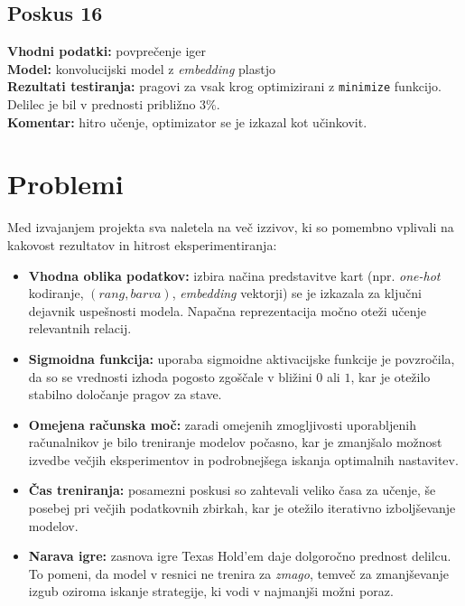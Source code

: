 \documentclass[a4paper,12pt]{article}
\begin{document}
\subsection{Poskus 16}
\textbf{Vhodni podatki:} povprečenje iger \\
\textbf{Model:} konvolucijski model z \textit{embedding} plastjo \\
\textbf{Rezultati testiranja:} pragovi za vsak krog optimizirani z \texttt{minimize} funkcijo. 
Delilec je bil v prednosti približno $3\%$. \\
\textbf{Komentar:} hitro učenje, optimizator se je izkazal kot učinkovit.


\section{Problemi}

Med izvajanjem projekta sva naletela na več izzivov, ki so pomembno vplivali na kakovost rezultatov in hitrost eksperimentiranja:

\begin{itemize}
    \item \textbf{Vhodna oblika podatkov:} izbira načina predstavitve kart (npr. \textit{one-hot} kodiranje, $(rang, barva)$, 
    \textit{embedding} vektorji) se je izkazala za ključni dejavnik uspešnosti modela. Napačna reprezentacija 
    močno oteži učenje relevantnih relacij.
    
    \item \textbf{Sigmoidna funkcija:} uporaba sigmoidne aktivacijske funkcije je povzročila, da so se vrednosti izhoda 
    pogosto zgoščale v bližini $0$ ali $1$, kar je otežilo stabilno določanje pragov za stave.
    
    \item \textbf{Omejena računska moč:} zaradi omejenih zmogljivosti uporabljenih računalnikov je bilo treniranje 
    modelov počasno, kar je zmanjšalo možnost izvedbe večjih eksperimentov in podrobnejšega iskanja optimalnih nastavitev.
    
    \item \textbf{Čas treniranja:} posamezni poskusi so zahtevali veliko časa za učenje, še posebej pri večjih podatkovnih 
    zbirkah, kar je otežilo iterativno izboljševanje modelov.
    
    \item \textbf{Narava igre:} zasnova igre Texas Hold'em daje dolgoročno prednost delilcu. 
    To pomeni, da model v resnici ne trenira za \emph{zmago}, temveč za zmanjševanje izgub oziroma iskanje 
    strategije, ki vodi v najmanjši možni poraz.
\end{itemize}
\end{document}
